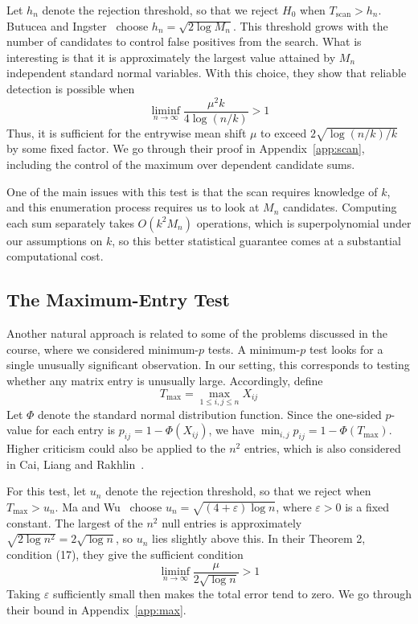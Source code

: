 \documentclass[12pt]{article}
\begin{document}
Let $h_n$ denote the rejection threshold, so that we reject $H_0$ when
$T_{\mathrm{scan}}>h_n$. Butucea and Ingster~\cite[Theorem 2.1]{BI2013}
choose $h_n=\sqrt{2\log M_n}$. This threshold grows with the number
of candidates to control false positives from the search. What is interesting is that it is
approximately the largest value attained by $M_n$ independent standard
normal variables. With this choice, they show that reliable detection
is possible when
\[
\liminf_{n\to\infty}\frac{\mu^2k}{4\log(n/k)}>1
\]
Thus, it is sufficient for the entrywise mean shift $\mu$ to exceed
$2\sqrt{\log(n/k)/k}$ by some fixed factor. We go through their proof in
Appendix~\ref{app:scan}, including the control of the maximum over
dependent candidate sums.

One of the main issues with this test is that the scan requires knowledge of $k$,
and this enumeration process requires us to look at $M_n$ candidates. Computing each
sum separately takes $O(k^2M_n)$ operations, which is superpolynomial
under our assumptions on $k$, so this better statistical guarantee
comes at a substantial computational cost.

\subsection{The Maximum-Entry Test}

Another natural approach is related to some of the problems
discussed in the course, where we considered minimum-$p$ tests. A minimum-$p$ test looks for a single
unusually significant observation. In our setting, this
corresponds to testing whether any matrix entry is unusually
large. Accordingly, define
\[
T_{\mathrm{max}}=\max_{1\leq i,j\leq n}X_{ij}
\]
Let $\Phi$ denote the standard normal distribution function. Since the
one-sided $p$-value for each entry is $p_{ij}=1-\Phi(X_{ij})$, we have
$\min_{i,j}p_{ij}=1-\Phi(T_{\mathrm{max}})$. Higher criticism could also be applied to the $n^2$
entries, which is also considered in Cai, Liang and Rakhlin~\cite{CLR2017}.

For this test, let $u_n$ denote the rejection threshold, so that we
reject when $T_{\mathrm{max}}>u_n$. Ma and Wu~\cite[Lemma 1]{MW2015}
choose $u_n=\sqrt{(4+\varepsilon)\log n}$, where $\varepsilon>0$
is a fixed constant. The largest of the $n^2$ null entries is
approximately $\sqrt{2\log n^2}=2\sqrt{\log n}$, so $u_n$ lies slightly
above this. In their Theorem 2, condition (17), they give the sufficient
condition
\[
\liminf_{n\to\infty}\frac{\mu}{2\sqrt{\log n}}>1
\]
Taking $\varepsilon$ sufficiently small then makes the total error tend
to zero. We go through their bound in Appendix~\ref{app:max}.
\end{document}
